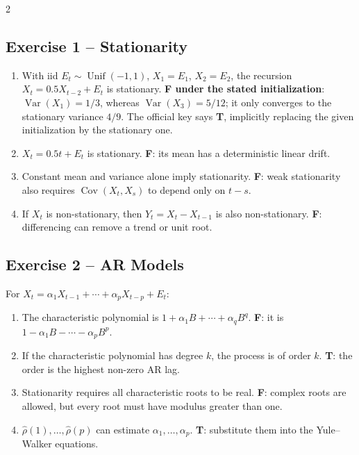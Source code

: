 \documentclass[9pt,a4paper]{extarticle}
\begin{document}
\begin{multicols}{2}
\subsection*{Exercise 1 -- Stationarity}
\begin{enumerate}[label=\alph*),leftmargin=4mm]
\item With iid \(E_t\sim\operatorname{Unif}(-1,1)\), \(X_1=E_1\), \(X_2=E_2\), the recursion \(X_t=0.5X_{t-2}+E_t\) is stationary. \textbf{F under the stated initialization}: \(\operatorname{Var}(X_1)=1/3\), whereas \(\operatorname{Var}(X_3)=5/12\); it only converges to the stationary variance \(4/9\). The official key says \textbf{T}, implicitly replacing the given initialization by the stationary one.
\item \(X_t=0.5t+E_t\) is stationary. \textbf{F}: its mean has a deterministic linear drift.
\item Constant mean and variance alone imply stationarity. \textbf{F}: weak stationarity also requires \(\operatorname{Cov}(X_t,X_s)\) to depend only on \(t-s\).
\item If \(X_t\) is non-stationary, then \(Y_t=X_t-X_{t-1}\) is also non-stationary. \textbf{F}: differencing can remove a trend or unit root.
\end{enumerate}

\subsection*{Exercise 2 -- AR Models}
For \(X_t=\alpha_1X_{t-1}+\cdots+\alpha_pX_{t-p}+E_t\):
\begin{enumerate}[label=\alph*),leftmargin=4mm]
\item The characteristic polynomial is \(1+\alpha_1B+\cdots+\alpha_qB^q\). \textbf{F}: it is \(1-\alpha_1B-\cdots-\alpha_pB^p\).
\item If the characteristic polynomial has degree \(k\), the process is of order \(k\). \textbf{T}: the order is the highest non-zero AR lag.
\item Stationarity requires all characteristic roots to be real. \textbf{F}: complex roots are allowed, but every root must have modulus greater than one.
\item \(\widehat\rho(1),\ldots,\widehat\rho(p)\) can estimate \(\alpha_1,\ldots,\alpha_p\). \textbf{T}: substitute them into the Yule--Walker equations.
\end{enumerate}


\end{multicols}
\end{document}
